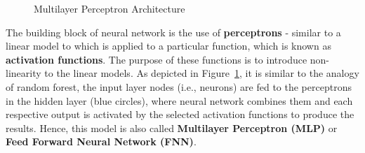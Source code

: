 \documentclass[oneside, 12pt]{article}
\def\nstyle{int(\lay<\Nnodlen?min(2,\lay):3)} %
\newcommand*{\1}{\text{\scalebox{1.1}{\usefont{U}{bbold}{m}{n}1}}}
\begin{document}
\begin{figure}[h]
\centering
{}
\caption{Multilayer Perceptron Architecture}
\label{nn}
\end{figure}
The building block of neural network is the use of \textbf{perceptrons} - similar to a linear model to which is applied to a particular function, which is known as \textbf{activation functions}. The purpose of these functions is to introduce non-linearity to the linear models. As depicted in Figure~\ref{nn}, it is similar to the analogy of random forest, the input layer nodes (i.e., neurons) are fed to the perceptrons in the hidden layer (blue circles), where neural network combines them and each respective output is activated by the selected activation functions to produce the results. Hence, this model is also called \textbf{Multilayer Perceptron (MLP)} or \textbf{Feed Forward Neural Network (FNN)}. \newline
\end{document}
